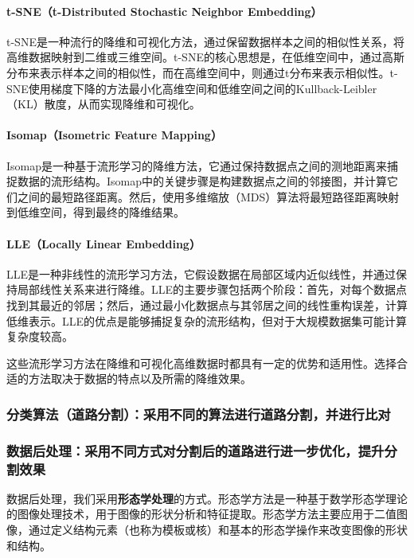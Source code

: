 \documentclass[12pt,hyperref,a4paper,UTF8]{ctexart}
\begin{document}
\paragraph{t-SNE（t-Distributed Stochastic Neighbor Embedding）}
t-SNE是一种流行的降维和可视化方法，通过保留数据样本之间的相似性关系，将高维数据映射到二维或三维空间。t-SNE的核心思想是，在低维空间中，通过高斯分布来表示样本之间的相似性，而在高维空间中，则通过t分布来表示相似性。t-SNE使用梯度下降的方法最小化高维空间和低维空间之间的Kullback-Leibler（KL）散度，从而实现降维和可视化。

\paragraph{Isomap（Isometric Feature Mapping）}
Isomap是一种基于流形学习的降维方法，它通过保持数据点之间的测地距离来捕捉数据的流形结构。Isomap中的关键步骤是构建数据点之间的邻接图，并计算它们之间的最短路径距离。然后，使用多维缩放（MDS）算法将最短路径距离映射到低维空间，得到最终的降维结果。

\paragraph{LLE（Locally Linear Embedding）}
LLE是一种非线性的流形学习方法，它假设数据在局部区域内近似线性，并通过保持局部线性关系来进行降维。LLE的主要步骤包括两个阶段：首先，对每个数据点找到其最近的邻居；然后，通过最小化数据点与其邻居之间的线性重构误差，计算低维表示。LLE的优点是能够捕捉复杂的流形结构，但对于大规模数据集可能计算复杂度较高。

\par
这些流形学习方法在降维和可视化高维数据时都具有一定的优势和适用性。选择合适的方法取决于数据的特点以及所需的降维效果。


\subsubsection{分类算法（道路分割）：采用不同的算法进行道路分割，并进行比对}

\subsubsection{数据后处理：采用不同方式对分割后的道路进行进一步优化，提升分割效果}
数据后处理，我们采用\textbf{形态学处理}的方式。形态学方法是一种基于数学形态学理论的图像处理技术，用于图像的形状分析和特征提取。形态学方法主要应用于二值图像，通过定义结构元素（也称为模板或核）和基本的形态学操作来改变图像的形状和结构。
\end{document}

